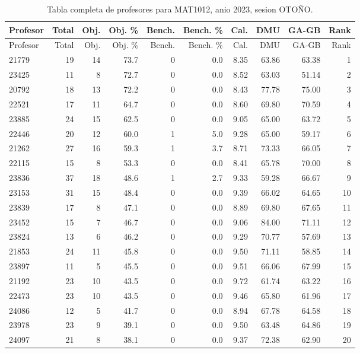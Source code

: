 \begingroup
\scriptsize
\setlength{\tabcolsep}{3pt}
\begin{longtable}{lrrrrrrrrr}
\caption{Tabla completa de profesores para MAT1012, anio 2023, sesion OTOÑO.}\label{tab:prof-period-mat1012-2023-oto-o}\\
\toprule
Profesor & Total & Obj. & Obj. \% & Bench. & Bench. \% & Cal. & DMU & GA-GB & Rank \\
\midrule
\endfirsthead
\toprule
Profesor & Total & Obj. & Obj. \% & Bench. & Bench. \% & Cal. & DMU & GA-GB & Rank \\
\midrule
\endhead
21779 & 19 & 14 & 73.7 & 0 & 0.0 & 8.35 & 63.86 & 63.38 & 1 \\
23425 & 11 & 8 & 72.7 & 0 & 0.0 & 8.52 & 63.03 & 51.14 & 2 \\
20792 & 18 & 13 & 72.2 & 0 & 0.0 & 8.43 & 77.78 & 75.00 & 3 \\
22521 & 17 & 11 & 64.7 & 0 & 0.0 & 8.60 & 69.80 & 70.59 & 4 \\
23885 & 24 & 15 & 62.5 & 0 & 0.0 & 9.05 & 65.00 & 63.72 & 5 \\
22446 & 20 & 12 & 60.0 & 1 & 5.0 & 9.28 & 65.00 & 59.17 & 6 \\
21262 & 27 & 16 & 59.3 & 1 & 3.7 & 8.71 & 73.33 & 66.05 & 7 \\
22115 & 15 & 8 & 53.3 & 0 & 0.0 & 8.41 & 65.78 & 70.00 & 8 \\
23836 & 37 & 18 & 48.6 & 1 & 2.7 & 9.33 & 59.28 & 66.67 & 9 \\
23153 & 31 & 15 & 48.4 & 0 & 0.0 & 9.39 & 66.02 & 64.65 & 10 \\
23839 & 17 & 8 & 47.1 & 0 & 0.0 & 8.89 & 69.80 & 67.65 & 11 \\
23452 & 15 & 7 & 46.7 & 0 & 0.0 & 9.06 & 84.00 & 71.11 & 12 \\
23824 & 13 & 6 & 46.2 & 0 & 0.0 & 9.29 & 70.77 & 57.69 & 13 \\
21853 & 24 & 11 & 45.8 & 0 & 0.0 & 9.50 & 71.11 & 58.85 & 14 \\
23897 & 11 & 5 & 45.5 & 0 & 0.0 & 9.51 & 66.06 & 67.99 & 15 \\
21192 & 23 & 10 & 43.5 & 0 & 0.0 & 9.72 & 61.74 & 63.22 & 16 \\
22473 & 23 & 10 & 43.5 & 0 & 0.0 & 9.46 & 65.80 & 61.96 & 17 \\
24086 & 12 & 5 & 41.7 & 0 & 0.0 & 8.94 & 67.78 & 64.58 & 18 \\
23978 & 23 & 9 & 39.1 & 0 & 0.0 & 9.50 & 63.48 & 64.86 & 19 \\
24097 & 21 & 8 & 38.1 & 0 & 0.0 & 9.37 & 72.38 & 62.90 & 20 \\

\end{longtable}

